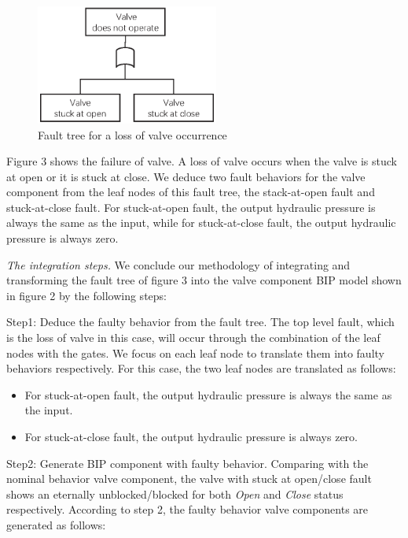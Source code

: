 \begin{figure}[htbp]
	\centerline{\includegraphics[width=60mm]{figure/example_fault_tree.eps}}
	\caption{Fault tree for a loss of valve occurrence}
	\label{example_BIP_nominal}
\end{figure}

Figure 3 shows the failure of valve. A loss of valve occurs when the valve is stuck at open or it is stuck at close. We deduce two fault behaviors for the valve component from the leaf nodes of this fault tree, the stack-at-open fault and stuck-at-close fault. For stuck-at-open fault, the output hydraulic pressure is always the same as the input, while for stuck-at-close fault, the output hydraulic pressure is always zero.

\emph{The integration steps.} We conclude our methodology of integrating and transforming the fault tree of figure 3 into the valve component BIP model shown in figure 2 by the following steps:

Step1: Deduce the faulty behavior from the fault tree. The top level fault, which is the loss of valve in this case, will occur through the combination of the leaf nodes with the gates. We focus on each leaf node to translate them into faulty behaviors respectively. For this case, the two leaf nodes are translated as follows:

\begin{itemize}
	\item For stuck-at-open fault, the output hydraulic pressure is always the same as the input.
	\item For stuck-at-close fault, the output hydraulic pressure is always zero.
\end{itemize}

Step2: Generate BIP component with faulty behavior. Comparing with the nominal behavior valve component, the valve with stuck at open/close fault shows an eternally unblocked/blocked for both \emph{Open} and \emph{Close} status respectively. According to step 2, the faulty behavior valve components are generated as follows:


